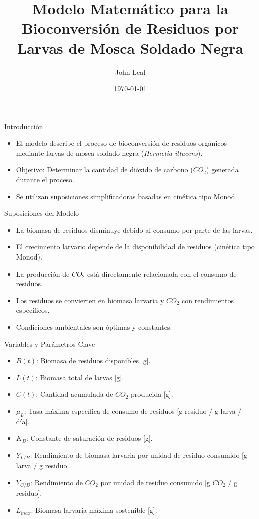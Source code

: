 \documentclass{beamer}
\title{Modelo Matemático para la Bioconversión de Residuos por Larvas de Mosca Soldado Negra}
\author{John Leal}
\institute{Universidad Nacional de Colombia}
\date{\today}
\begin{document}
\begin{frame}
    \titlepage
\end{frame}

\begin{frame}{Introducción}
    \begin{itemize}
        \item El modelo describe el proceso de bioconversión de residuos orgánicos mediante larvas de mosca soldado negra (\textit{Hermetia illucens}).
        \item Objetivo: Determinar la cantidad de dióxido de carbono ($CO_2$) generada durante el proceso.
        \item Se utilizan suposiciones simplificadoras basadas en cinética tipo Monod.
    \end{itemize}
\end{frame}

\begin{frame}{Suposiciones del Modelo}
    \begin{itemize}
        \item La biomasa de residuos disminuye debido al consumo por parte de las larvas.
        \item El crecimiento larvario depende de la disponibilidad de residuos (cinética tipo Monod).
        \item La producción de $CO_2$ está directamente relacionada con el consumo de residuos.
        \item Los residuos se convierten en biomasa larvaria y $CO_2$ con rendimientos específicos.
        \item Condiciones ambientales son óptimas y constantes.
    \end{itemize}
\end{frame}

\begin{frame}{Variables y Parámetros Clave}
    \begin{itemize}
        \item $B(t)$: Biomasa de residuos disponibles [g].
        \item $L(t)$: Biomasa total de larvas [g].
        \item $C(t)$: Cantidad acumulada de $CO_2$ producida [g].
        \item $\mu_L$: Tasa máxima específica de consumo de residuos [g residuo / g larva / día].
        \item $K_B$: Constante de saturación de residuos [g].
        \item $Y_{L/B}$: Rendimiento de biomasa larvaria por unidad de residuo consumido [g larva / g residuo].
        \item $Y_{C/B}$: Rendimiento de $CO_2$ por unidad de residuo consumido [g $CO_2$ / g residuo].
        \item $L_{max}$: Biomasa larvaria máxima sostenible [g].
    \end{itemize}
\end{frame}
\end{document}
